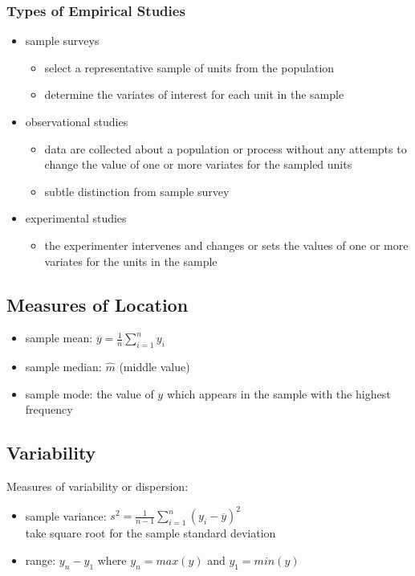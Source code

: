 \documentclass[11pt]{article}
\begin{document}
\subsubsection{Types of Empirical Studies}
\begin{itemize}
  \item sample surveys
  \begin{itemize}
    \item select a representative sample of units from the population
    \item determine the variates of interest for each unit in the sample 
  \end{itemize}
  \item observational studies 
  \begin{itemize}
    \item data are collected about a population or process without any attempts to change the value of one or more variates for the sampled units 
    \item subtle distinction from sample survey 
  \end{itemize}
  \item experimental studies 
  \begin{itemize}
    \item the experimenter intervenes and changes or sets the values of one or more variates for the units in the sample
  \end{itemize}
\end{itemize}
\subsection{Measures of Location}
\begin{itemize}
  \item sample mean: $\overline{y} = \frac{1}{n}\sum_{i=1}^{n}y_i$
  \item sample median: $\hat{m}$ (middle value)
  \item sample mode: the value of $y$ which appears in the sample with the highest frequency
\end{itemize}
\subsection{Variability}
Measures of variability or dispersion:
\begin{itemize}
  \item sample variance: $s^2 = \frac{1}{n-1}\sum_{i=1}^{n}(y_i-\overline{y})^2$ \\
  take square root for the sample standard deviation
  \item range: $y_n-y_1$ where $y_n= max(y)$ and $y_1= min(y)$
\end{itemize}
\end{document}
